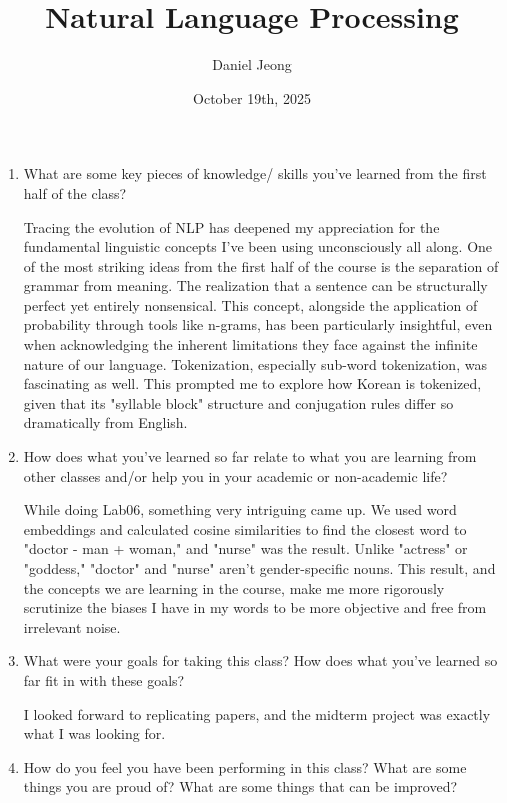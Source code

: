 \documentclass{report}
\title{\Huge{Natural Language Processing}}
\author{\huge{Daniel Jeong}}
\date{October 19th, 2025}
\begin{document}
\maketitle
\newpage%
\tableofcontents
\pagebreak


\begin{enumerate}
    \item What are some key pieces of knowledge/ skills you've learned from the first half of the class?

          Tracing the evolution of NLP has deepened my appreciation for the fundamental linguistic concepts I've been using unconsciously all along. One of the most striking ideas from the first half of the course is the separation of grammar from meaning. The realization that a sentence can be structurally perfect yet entirely nonsensical. This concept, alongside the application of probability through tools like n-grams, has been particularly insightful, even when acknowledging the inherent limitations they face against the infinite nature of our language. Tokenization, especially sub-word tokenization, was fascinating as well. This prompted me to explore how Korean is tokenized, given that its "syllable block" structure and conjugation rules differ so dramatically from English.

    \item How does what you've learned so far relate to what you are learning from other classes and/or help you in your academic or non-academic life?

          While doing Lab06, something very intriguing came up. We used word embeddings and calculated cosine similarities to find the closest word to "doctor - man + woman," and "nurse" was the result. Unlike "actress" or "goddess," "doctor" and "nurse" aren't gender-specific nouns. This result, and the concepts we are learning in the course, make me more rigorously scrutinize the biases I have in my words to be more objective and free from irrelevant noise.

    \item What were your goals for taking this class? How does what you've learned so far fit in with these goals?

          I looked forward to replicating papers, and the midterm project was exactly what I was looking for.

    \item How do you feel you have been performing in this class? What are some things you are proud of? What are some things that can be improved?


\end{enumerate}
\end{document}
